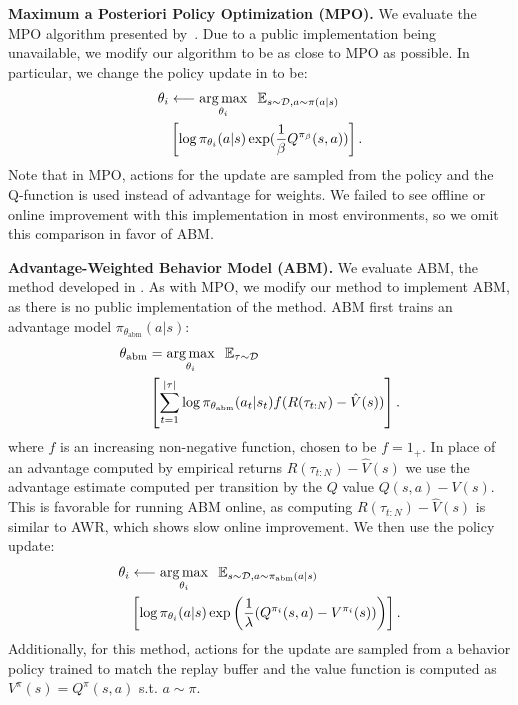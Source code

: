 \documentclass[conference]{IEEEtran}
\begin{document}
\textbf{Maximum a Posteriori Policy Optimization (MPO).} We evaluate the MPO algorithm presented by~\citet{we2018mpo}. Due to a public implementation being unavailable, we modify our algorithm to be as close to MPO as possible. In particular, we change the policy update in \METHOD to be: 
\begin{align}
    \theta_i & \longleftarrow \operatorname*{arg\,max}_{\theta_i} \; \; \mathbb{E}_{s \sim \mathcal{D}, a \sim \pi(a|s)} \; \nonumber \\ 
    &\left[\log \pi_{\theta_i}(a|s) \exp(\frac{1}{\beta}Q^{\pi_\beta}(s, a))\right].
\end{align}
Note that in MPO, actions for the update are sampled from the policy and the Q-function is used instead of advantage for weights. We failed to see offline or online improvement with this implementation in most environments, so we omit this comparison in favor of ABM.

\textbf{Advantage-Weighted Behavior Model (ABM).} We evaluate ABM, the method developed in \citet{siegel2020abm}. As with MPO, we modify our method to implement ABM, as there is no public implementation of the method. ABM first trains an advantage model $\pi_{\theta_\text{abm}}(a|s)$:
\begin{align}
    \theta_\text{abm} &= \operatorname*{arg\,max}_{\theta_i} \; \; \mathbb{E}_{\tau \sim \mathcal{D}} \nonumber \\ &\left[\sum_{t=1}^{|\tau|} \log \pi_{\theta_\text{abm}}(a_t|s_t)f(R(\tau_{t:N})-\hat{V}(s))\right].
\end{align}
where $f$ is an increasing non-negative function, chosen to be $f = 1_+$. In place of an advantage computed by empirical returns $R(\tau_{t:N})-\hat{V}(s)$ we use the advantage estimate computed per transition by the $Q$ value $Q(s, a)-V(s)$. This is favorable for running ABM online, as computing $R(\tau_{t:N})-\hat{V}(s)$ is similar to AWR, which shows slow online improvement. We then use the policy update: 
\begin{align}
    \theta_i & \longleftarrow \operatorname*{arg\,max}_{\theta_i} \; \; \mathbb{E}_{s \sim \mathcal{D}, a \sim \pi_\text{abm}(a|s)} \nonumber \\
    &\left[\log \pi_{\theta_i}(a|s)  \exp\left(\frac{1}{\lambda}(Q^{\pi_i}(s, a)-V^{\pi_i}(s))\right)\right].
\end{align}
Additionally, for this method, actions for the update are sampled from a behavior policy trained to match the replay buffer and the value function is computed as $V^\pi(s) = Q^\pi(s, a)$ s.t. $a \sim \pi$.
\end{document}
